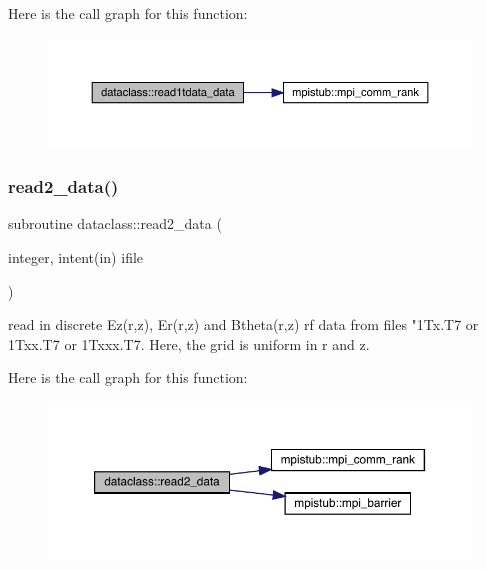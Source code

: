 Here is the call graph for this function\+:\nopagebreak
\begin{figure}[H]
\begin{center}
\leavevmode
\includegraphics[width=350pt]{namespacedataclass_a5167a50ad979e317b65f07bf468212d8_cgraph}
\end{center}
\end{figure}
\mbox{\label{namespacedataclass_abf0c8413e040d7ea8c0bc5df73c9ef96}} 
\subsubsection{\texorpdfstring{read2\_data()}{read2\_data()}}
{\footnotesize\ttfamily subroutine dataclass\+::read2\+\_\+data (\begin{DoxyParamCaption}\item[{integer, intent(in)}]{ifile }\end{DoxyParamCaption})}



read in discrete Ez(r,z), Er(r,z) and Btheta(r,z) rf data from files "1\+Tx.\+T7 or 1\+Txx.\+T7 or 1\+Txxx.\+T7. Here, the grid is uniform in r and z. 

Here is the call graph for this function\+:\nopagebreak
\begin{figure}[H]
\begin{center}
\leavevmode
\includegraphics[width=350pt]{namespacedataclass_abf0c8413e040d7ea8c0bc5df73c9ef96_cgraph}
\end{center}
\end{figure}
\mbox{\label{namespacedataclass_a6a03d5b21b9316f6fd4053aeb7acb426}} 
